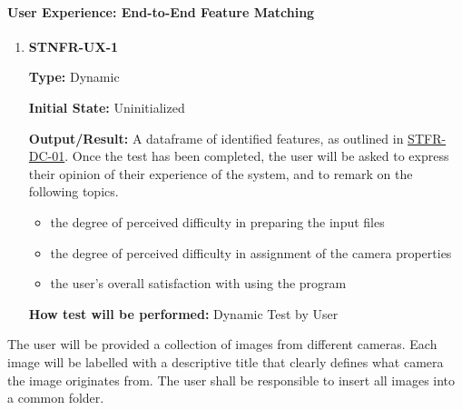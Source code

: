 \documentclass[12pt, titlepage]{article}
\begin{document}
\paragraph{User Experience: End-to-End Feature Matching}
\begin{enumerate}
\item \hypertarget{STNFR-UX-1}{\textbf{STNFR-UX-1}\\}
\textbf{Type:} Dynamic

\textbf{Initial State:} Uninitialized

\textbf{Output/Result:} A dataframe of identified features, as outlined in \hyperlink{STFR-DC-01}{STFR-DC-01}. 
Once the test has been completed, the user will be asked to express their opinion of their experience of the 
system, and to remark on the following topics.
\begin{itemize}
\item the degree of perceived difficulty in preparing the input files
\item the degree of perceived difficulty in assignment of the camera properties
\item the user's overall satisfaction with using the program
\end{itemize} 

\textbf{How test will be performed:} Dynamic Test by User
\end{enumerate}

The user will be provided a collection of images from different cameras. Each image will be labelled with 
a descriptive title that clearly defines what camera the image originates from. The user shall be responsible 
to insert all images into a common folder.
\end{document}

